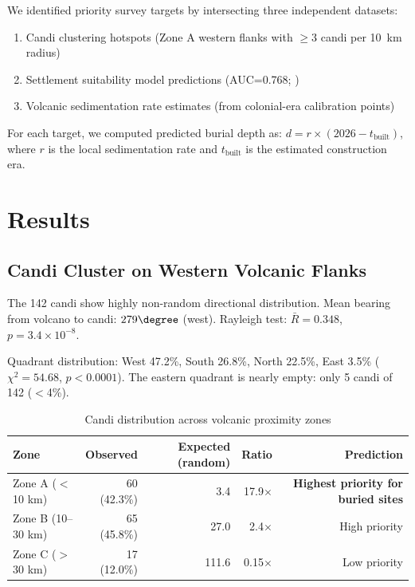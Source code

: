 \documentclass[12pt,a4paper]{article}
\begin{document}
We identified priority survey targets by intersecting three independent datasets:
\begin{enumerate}
    \item Candi clustering hotspots (Zone A western flanks with $\geq$3 candi per 10~km radius)
    \item Settlement suitability model predictions (AUC=0.768; \citealp{amien2026p2})
    \item Volcanic sedimentation rate estimates (from colonial-era calibration points)
\end{enumerate}

For each target, we computed predicted burial depth as: $d = r \times (2026 - t_{\text{built}})$, where $r$ is the local sedimentation rate and $t_{\text{built}}$ is the estimated construction era.

\section{Results}

\subsection{Candi Cluster on Western Volcanic Flanks}

The 142 candi show highly non-random directional distribution. Mean bearing from volcano to candi: $279\degree$ (west). Rayleigh test: $\bar{R}=0.348$, $p=3.4\times10^{-8}$.

Quadrant distribution: West 47.2\%, South 26.8\%, North 22.5\%, East 3.5\% ($\chi^2=54.68$, $p<0.0001$). The eastern quadrant is nearly empty: only 5 candi of 142 ($<$4\%).

\begin{table}[h]
\centering
\caption{Candi distribution across volcanic proximity zones}
\begin{tabular}{lrrrr}
\toprule
Zone & Observed & Expected (random) & Ratio & Prediction \\
\midrule
Zone A ($<$10 km) & 60 (42.3\%) & 3.4 & 17.9$\times$ & \textbf{Highest priority for buried sites} \\
Zone B (10--30 km) & 65 (45.8\%) & 27.0 & 2.4$\times$ & High priority \\
Zone C ($>$30 km) & 17 (12.0\%) & 111.6 & 0.15$\times$ & Low priority \\
\bottomrule
\end{tabular}
\label{tab:zones}
\end{table}
\end{document}
